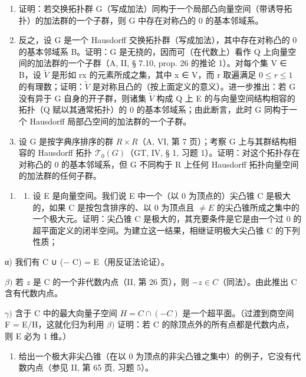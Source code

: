 \begin{enumerate}
\def\labelenumi{\alph{enumi})}
\item
  证明：若交换拓扑群 G（写成加法）同构于一个局部凸向量空间（带诱导拓扑）的加法群的一个子群，则 G 中存在对称凸的 0 的基本邻域系。
\item
  反之，设 G 是一个 Hausdorff 交换拓扑群（写成加法），其中存在对称凸的 0 的基本邻域系 B。证明：G 是无挠的，因而可（在代数上）看作 Q 上向量空间的加法群的一个子群（A, II, § 7.10, prop. 26 的推论 1）。对每个集 V ∈ B，设 \(\tilde{V}\) 是形如 rx 的元素所成之集，其中 x ∈ V，而 r 取遍满足 \(0 \leqslant r \leqslant 1\) 的有理数；证明：\(\tilde{V}\) 是对称且凸的（按上面定义的意义）。进一步推出：若 G 没有异于 G 自身的开子群，则诸集 \(\tilde{V}\) 构成 Q 上 E 的与向量空间结构相容的拓扑（Q 赋以其通常拓扑）的 0 的基本邻域系；由此断言，此时 G 同构于一个 Hausdorff 局部凸空间的加法群的一个子群。
\item
  设 G 是按字典序排序的群 \(R \times R\)（A, VI, 第 7 页）；考察 G 上与其群结构相容的 Hausdorff 拓扑 \(\mathcal{T}_{0}(G)\)（GT, IV, § 1, 习题 1）。证明：对这个拓扑存在对称凸的 0 的基本邻域系，但 G 不同构于 R 上任何 Hausdorff 拓扑向量空间的加法群的任何子群。
\end{enumerate}

\exercisegroup

\begin{enumerate}
\def\labelenumi{\arabic{enumi})}
\tightlist
\item
  \begin{enumerate}
  \def\labelenumii{\alph{enumii})}
  \tightlist
  \item
    设 E 是向量空间。我们说 E 中一个（以 0 为顶点的）尖凸锥 C 是极大的，如果 C 是按包含排序的、以 0 为顶点且 \(\neq E\) 的尖凸锥所成之集中的一个极大元。证明：尖凸锥 C 是极大的，其充要条件是它是由一个过 0 的超平面定义的闭半空间。为建立这一结果，相继证明极大尖凸锥 C 的下列性质；
  \end{enumerate}
\end{enumerate}

α) 我们有 C ∪ (− C) = E（用反证法论证）。

\(\beta)\) 若 \(z\) 是 C 的一个非代数内点（II, 第 26 页），则 \(-z \in C\)（同法）。由此推出 C 含有代数内点。

\(\gamma)\) 含于 C 中的最大向量子空间 \(H = C \cap (-C)\) 是一个超平面。（过渡到商空间 F = E/H，这就化归为利用 \(\beta)\) 证明：若 C 的除顶点外的所有点都是代数内点，则 E 必为 1 维。）

\begin{enumerate}
\def\labelenumi{\alph{enumi})}
\setcounter{enumi}{1}
\tightlist
\item
  给出一个极大非尖凸锥（在以 0 为顶点的非尖凸锥之集中）的例子，它没有代数内点（参见 II, 第 65 页, 习题 5）。
\end{enumerate}

